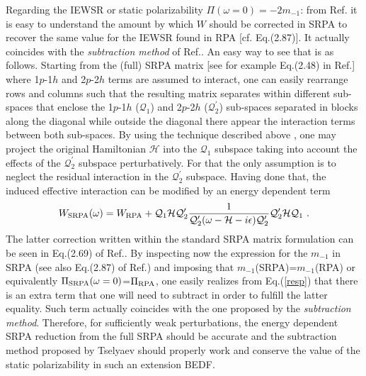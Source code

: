 \documentclass[12pt,a4paper,final]{iopart}
\begin{document}
Regarding the IEWSR or static polarizability $\Pi(\omega=0)=-2m_{-1}$: from Ref.\cite{wambach1990} it is easy to understand the amount by which $W$ should be corrected in SRPA to recover the same value for the IEWSR found in RPA [cf. Eq.(2.87)]. It actually coincides with the {\it subtraction method} of Ref.\cite{tselyaev2013}. An easy way to see that is as follows. Starting from the (full) SRPA matrix [see for example Eq.(2.48) in Ref.\cite{wambach1990}] where 1$p$-1$h$ and 2$p$-2$h$ terms are assumed to interact, one can easily rearrange rows and columns such that the resulting matrix separates within different sub-spaces that enclose the 1$p$-1$h$ ($\mathcal{Q}_1$) and 2$p$-2$h$ ($\mathcal{Q}_2^\prime$) sub-spaces separated in blocks along the diagonal while outside the diagonal there appear the interaction terms between both sub-spaces. By using the technique described above \cite{yoshida1983}, one may project the original Hamiltonian $\mathcal{H}$ into the $\mathcal{Q}_1$ subspace taking into account the effects of the $\mathcal{Q}_2^\prime$ subspace perturbatively. For that the only assumption is to neglect the residual interaction in the $\mathcal{Q}_2^\prime$ subspace. Having done that, the induced effective interaction can be modified by an energy dependent term
\begin{equation}
W_{\rm SRPA}(\omega) = W_{\rm RPA} + \mathcal{Q}_1\mathcal{H}\mathcal{Q}_2^\prime\frac{1}{\mathcal{Q}_2^\prime(\omega-\mathcal{H}-i\epsilon)\mathcal{Q}_2^\prime}\mathcal{Q}_2^\prime\mathcal{H}\mathcal{Q}_1 \ .
\label{srpa}
\end{equation}   
The latter correction written within the standard SRPA matrix formulation can be seen in Eq.(2.69) of Ref.\cite{wambach1990}. By inspecting now the expression for the $m_{-1}$ in SRPA (see also Eq.(2.87) of Ref.\cite{wambach1990}) and imposing that $m_{-1}$(SRPA)=$m_{-1}$(RPA) or equivalently $\Pi_{\rm SRPA}(\omega=0)$=$\Pi_{\rm RPA}$, one easily realizes from Eq.(\ref{resp}) that there is an extra term that one will need to subtract in order to fulfill the latter equality. Such term actually coincides with the one proposed by the {\it subtraction method}. Therefore, for sufficiently weak perturbations, the energy dependent SRPA reduction from the full SRPA should be accurate and the subtraction method proposed by Tselyaev \cite{tselyaev2013} should properly work and conserve the value of the static polarizability in such an extension BEDF. 
\end{document}
